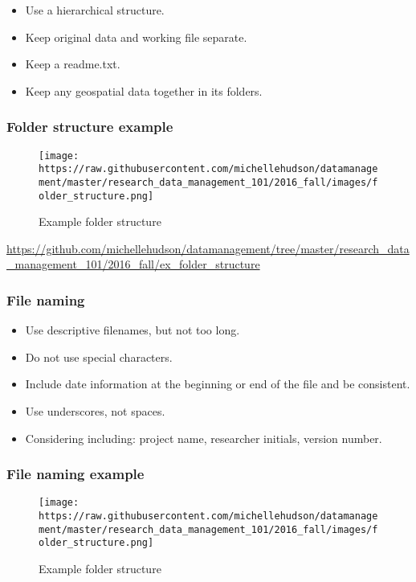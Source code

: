 \begin{itemize}
\tightlist
\item
  Use a hierarchical structure.
\item
  Keep original data and working file separate.
\item
  Keep a readme.txt.
\item
  Keep any geospatial data together in its folders.
\end{itemize}

\subsubsection{Folder structure example}\label{folder-structure-example}

\begin{figure}[htbp]
\centering
\texttt{[image: https://raw.githubusercontent.com/michellehudson/datamanagement/master/research\_data\_management\_101/2016\_fall/images/folder\_structure.png]}
\caption{Example folder structure}
\end{figure}

\url{https://github.com/michellehudson/datamanagement/tree/master/research_data_management_101/2016_fall/ex_folder_structure}

\subsubsection{File naming}\label{file-naming}

\begin{itemize}
\tightlist
\item
  Use descriptive filenames, but not too long.
\item
  Do not use special characters.
\item
  Include date information at the beginning or end of the file and be
  consistent.
\item
  Use underscores, not spaces.
\item
  Considering including: project name, researcher initials, version
  number.
\end{itemize}

\subsubsection{File naming example}\label{file-naming-example}

\begin{figure}[htbp]
\centering
\texttt{[image: https://raw.githubusercontent.com/michellehudson/datamanagement/master/research\_data\_management\_101/2016\_fall/images/folder\_structure.png]}
\caption{Example folder structure}
\end{figure}

